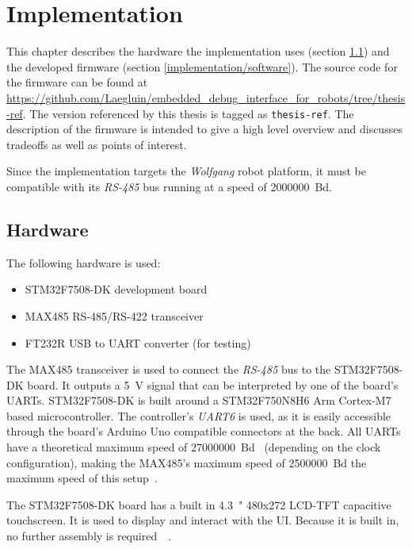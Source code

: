 \chapter{Implementation}
\label{implementation}

This chapter describes the hardware the implementation uses (section \ref{implementation/hardware})
and the developed firmware (section \ref{implementation/software}). The source code for the firmware
can be found at \url{https://github.com/Laegluin/embedded_debug_interface_for_robots/tree/thesis-ref}.
The version referenced by this thesis is tagged as \lstinline{thesis-ref}. The description of the
firmware is intended to give a high level overview and discusses tradeoffs as well as points of
interest.

Since the implementation targets the \textit{Wolfgang} robot platform, it must be compatible with
its \textit{RS-485} bus running at a speed of \SI{2000000}{Bd}.

\section{Hardware}
\label{implementation/hardware}

The following hardware is used:

\begin{itemize}
    \item STM32F7508-DK development board
    \item MAX485 RS-485/RS-422 transceiver
    \item FT232R USB to UART converter (for testing)
\end{itemize}

The MAX485 transceiver is used to connect the \textit{RS-485} bus to the STM32F7508-DK board. It
outputs a \SI{5}{\volt} signal that can be interpreted by one of the board's UARTs. STM32F7508-DK
is built around a STM32F750N8H6 Arm Cortex-M7 based microcontroller. The controller's \textit{UART6}
is used, as it is easily accessible through the board's Arduino Uno compatible connectors at the
back. All UARTs have a theoretical maximum speed of \SI{27000000}{Bd}~\cite{mcu-ref-manual} (depending
on the clock configuration), making the MAX485's maximum speed of \SI{2500000}{Bd} the maximum speed
of this setup~\cite{max-485-manual}\cite{board-user-manual}.

The STM32F7508-DK board has a built in \SI{4.3}{"} 480x272 LCD-TFT capacitive touchscreen. It is
used to display and interact with the UI. Because it is built in, no further assembly is required~\
\cite{board-user-manual}.

